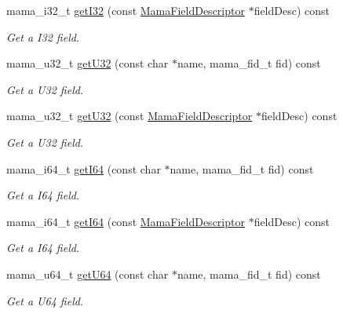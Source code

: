 \begin{DoxyCompactItemize}
mama\_\-i32\_\-t \hyperlink{classWombat_1_1MamaMsg_aa452365bd4997f223da26fdb53715a5a}{getI32} (const \hyperlink{classWombat_1_1MamaFieldDescriptor}{MamaFieldDescriptor} $\ast$fieldDesc) const 
\begin{DoxyCompactList}\small\item\em Get a I32 field. \item\end{DoxyCompactList}\item 
mama\_\-u32\_\-t \hyperlink{classWombat_1_1MamaMsg_aed31ea478ae25b7ad36644a39c50bfc5}{getU32} (const char $\ast$name, mama\_\-fid\_\-t fid) const 
\begin{DoxyCompactList}\small\item\em Get a U32 field. \item\end{DoxyCompactList}\item 
mama\_\-u32\_\-t \hyperlink{classWombat_1_1MamaMsg_a7ef51f9e163bd3b76eddd047da556a5d}{getU32} (const \hyperlink{classWombat_1_1MamaFieldDescriptor}{MamaFieldDescriptor} $\ast$fieldDesc) const 
\begin{DoxyCompactList}\small\item\em Get a U32 field. \item\end{DoxyCompactList}\item 
mama\_\-i64\_\-t \hyperlink{classWombat_1_1MamaMsg_ad2073c6e714a05469f778093a3b09ef9}{getI64} (const char $\ast$name, mama\_\-fid\_\-t fid) const 
\begin{DoxyCompactList}\small\item\em Get a I64 field. \item\end{DoxyCompactList}\item 
mama\_\-i64\_\-t \hyperlink{classWombat_1_1MamaMsg_aa13027401b1384865173a7ec5bc7d54d}{getI64} (const \hyperlink{classWombat_1_1MamaFieldDescriptor}{MamaFieldDescriptor} $\ast$fieldDesc) const 
\begin{DoxyCompactList}\small\item\em Get a I64 field. \item\end{DoxyCompactList}\item 
mama\_\-u64\_\-t \hyperlink{classWombat_1_1MamaMsg_a76f37c2c3c2cfafddda31c75137c54af}{getU64} (const char $\ast$name, mama\_\-fid\_\-t fid) const 
\begin{DoxyCompactList}\small\item\em Get a U64 field. \item\end{DoxyCompactList}\item 

\end{DoxyCompactItemize}
